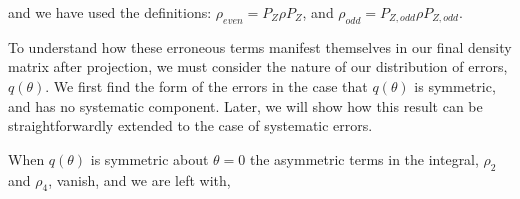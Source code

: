 \documentclass[prl, twocolumn, ,superscriptaddress]{revtex4-1}
\begin{document}
and we have used the definitions: $\rho_{even}=P_{Z}\rho P_{Z}$, and $\rho_{odd}=P_{Z,odd}\rho P_{Z,odd}$.

%

% 
 

To understand how these erroneous terms manifest themselves in our final density matrix after projection, we must consider the nature of our distribution of errors, $q(\theta)$. We first find the form of the errors in the case that $q(\theta)$ is symmetric, and has no systematic component. Later, we will show how this result can be straightforwardly extended to the case of systematic errors. 

When $q(\theta)$ is symmetric about $\theta=0$ the asymmetric terms in the integral, $\rho_2$ and $\rho_4$, vanish, and we are left
with,
\end{document}
